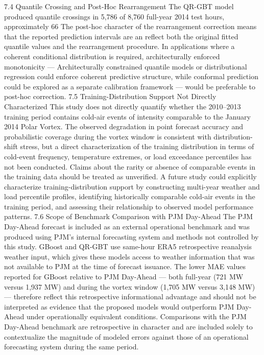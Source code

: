 7.4 Quantile Crossing and Post-Hoc Rearrangement
The QR-GBT model produced quantile crossings in 5,786 of 8,760 full-year 2014 test hours, approximately 66%
The post-hoc character of the rearrangement correction means that the reported prediction intervals are an reflect both the original fitted quantile values and the rearrangement procedure. In applications where a coherent conditional distribution is required, architecturally enforced monotonicity — Architecturally constrained quantile models or distributional regression could enforce coherent predictive structure, while conformal prediction could be explored as a separate calibration framework — would be preferable to post-hoc correction.
7.5 Training-Distribution Support Not Directly Characterized
This study does not directly quantify whether the 2010–2013 training period contains cold-air events of intensity comparable to the January 2014 Polar Vortex. The observed degradation in point forecast accuracy and probabilistic coverage during the vortex window is consistent with distribution-shift stress, but a direct characterization of the training distribution in terms of cold-event frequency, temperature extremes, or load exceedance percentiles has not been conducted. Claims about the rarity or absence of comparable events in the training data should be treated as unverified. A future study could explicitly characterize training-distribution support by constructing multi-year weather and load percentile profiles, identifying historically comparable cold-air events in the training period, and assessing their relationship to observed model performance patterns.
7.6 Scope of Benchmark Comparison with PJM Day-Ahead
The PJM Day-Ahead forecast is included as an external operational benchmark and was produced using PJM's internal forecasting system and methods not controlled by this study. GBoost and QR-GBT use same-hour ERA5 retrospective reanalysis weather input, which gives these models access to weather information that was not available to PJM at the time of forecast issuance. The lower MAE values reported for GBoost relative to PJM Day-Ahead — both full-year (721 MW versus 1,937 MW) and during the vortex window (1,705 MW versus 3,148 MW) — therefore reflect this retrospective informational advantage and should not be interpreted as evidence that the proposed models would outperform PJM Day-Ahead under operationally equivalent conditions. Comparisons with the PJM Day-Ahead benchmark are retrospective in character and are included solely to contextualize the magnitude of modeled errors against those of an operational forecasting system during the same period.
